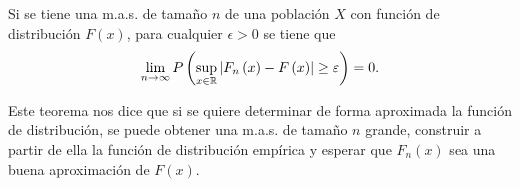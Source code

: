 \begin{theorem}
Si se tiene una m.a.s. de tamaño $\displaystyle n $ de una población $\displaystyle X $ con función de distribución $\displaystyle F\left(x\right) $, para cualquier $\displaystyle \epsilon > 0 $ se tiene que 
\[\lim_{n \to \infty}P\left(\sup_{x \in \mathbb{R}} \left|F_{n}\left(x\right)-F\left(x\right)\right|\geq \varepsilon \right) = 0 .\]
\end{theorem}
\begin{observation}
Este teorema nos dice que si se quiere determinar de forma aproximada la función de distribución, se puede obtener una m.a.s. de tamaño $\displaystyle n $ grande, construir a partir de ella la función de distribución empírica y esperar que $\displaystyle F_{n}\left(x\right) $ sea una buena aproximación de $\displaystyle F\left(x\right) $. 
\end{observation}
